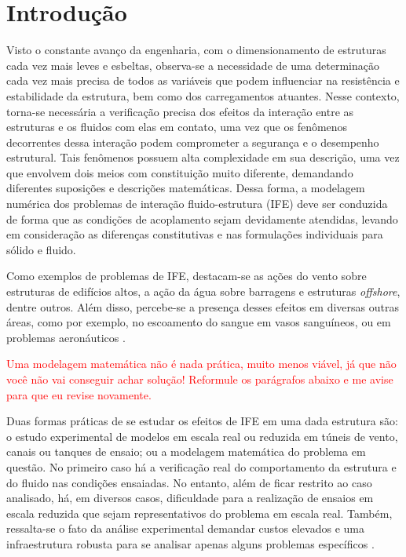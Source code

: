 \chapter{Introdução}


Visto o constante avanço da engenharia, com o dimensionamento de estruturas cada vez mais leves e esbeltas, observa-se a necessidade de uma determinação cada vez mais precisa de todos as variáveis que podem influenciar na resistência e estabilidade da estrutura, bem como dos carregamentos atuantes. Nesse contexto, torna-se necessária a verificação precisa dos efeitos da interação entre as estruturas e os fluidos com elas em contato, uma vez que os fenômenos decorrentes dessa interação podem comprometer a segurança e o desempenho estrutural. Tais fenômenos possuem alta complexidade em sua descrição, uma vez que envolvem dois meios com constituição muito diferente, demandando diferentes suposições e descrições matemáticas. Dessa forma, a modelagem numérica dos problemas de interação fluido-estrutura (IFE) deve ser conduzida de forma que as condições de acoplamento sejam devidamente atendidas, levando em consideração as diferenças constitutivas e nas formulações individuais para sólido e fluido.

Como exemplos de problemas de IFE, destacam-se as ações do vento sobre estruturas de edifícios altos, a ação da água sobre barragens e estruturas \textit{offshore}, dentre outros. Além disso, percebe-se a presença desses efeitos em diversas outras áreas, como por exemplo, no escoamento do sangue em vasos sanguíneos, ou em problemas aeronáuticos \cite{sanches2014fluid, fernandes2020tecnica}.

\textcolor{red}{Uma modelagem matemática não é nada prática, muito menos viável, já que não você não vai conseguir achar solução! Reformule os parágrafos abaixo e me avise para que eu revise novamente.}

Duas formas práticas de se estudar os efeitos de IFE em uma dada estrutura são: o estudo experimental de modelos em escala real ou reduzida em túneis de vento, canais ou tanques de ensaio; ou a modelagem matemática do problema em questão. No primeiro caso há a verificação real do comportamento da estrutura e do fluido nas condições ensaiadas. No entanto, além de ficar restrito ao caso analisado, há, em diversos casos, dificuldade para a realização de ensaios em escala reduzida que sejam representativos do problema em escala real. Também, ressalta-se o fato da análise experimental demandar custos elevados e uma infraestrutura robusta para se analisar apenas alguns problemas específicos \cite{fernandes2020tecnica}.

